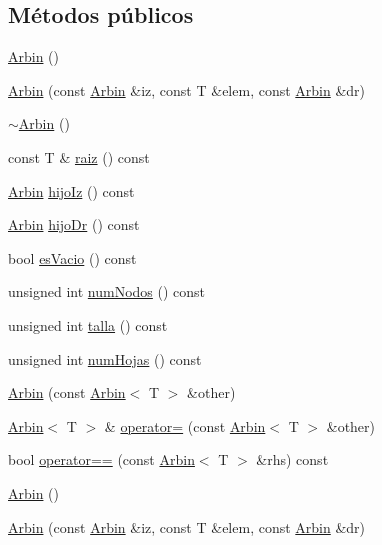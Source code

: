 \subsection*{\-Métodos públicos}
\begin{DoxyCompactItemize}
\item 
\hyperlink{class_arbin_aa0afe84fc8240dbd4539746ade54adac}{\-Arbin} ()
\item 
\hyperlink{class_arbin_abbd49f9c60575ea6a95dfff15492f8f9}{\-Arbin} (const \hyperlink{class_arbin}{\-Arbin} \&iz, const \-T \&elem, const \hyperlink{class_arbin}{\-Arbin} \&dr)
\item 
\hyperlink{class_arbin_a9045fbb22bb9e6a59deab2bf6f69e879}{$\sim$\-Arbin} ()
\item 
const \-T \& \hyperlink{class_arbin_a954e86d83269c6166bb21fd032914622}{raiz} () const 
\item 
\hyperlink{class_arbin}{\-Arbin} \hyperlink{class_arbin_a1ab4f143c3db9e6cb6c7c0c1bba18a6b}{hijo\-Iz} () const 
\item 
\hyperlink{class_arbin}{\-Arbin} \hyperlink{class_arbin_a0ca95be8314f9837667b86bd646aec8c}{hijo\-Dr} () const 
\item 
bool \hyperlink{class_arbin_ac82861483558c565d174a3afffd4778c}{es\-Vacio} () const 
\item 
unsigned int \hyperlink{class_arbin_a7167b5d88652581c404e3c3fc49177cb}{num\-Nodos} () const 
\item 
unsigned int \hyperlink{class_arbin_a875a7e020e2cf5c42dfeed73519c7ce4}{talla} () const 
\item 
unsigned int \hyperlink{class_arbin_aed6e1397e19b444f37f104cd76e235f9}{num\-Hojas} () const 
\item 
\hyperlink{class_arbin_a6a33e5b960e6b67eb906e86839d213ed}{\-Arbin} (const \hyperlink{class_arbin}{\-Arbin}$<$ \-T $>$ \&other)
\item 
\hyperlink{class_arbin}{\-Arbin}$<$ \-T $>$ \& \hyperlink{class_arbin_a20d48b162271c62a79adec950e779e0e}{operator=} (const \hyperlink{class_arbin}{\-Arbin}$<$ \-T $>$ \&other)
\item 
bool \hyperlink{class_arbin_af848201d495953438d4408ba7cc1c29d}{operator==} (const \hyperlink{class_arbin}{\-Arbin}$<$ \-T $>$ \&rhs) const 
\item 
\hyperlink{class_arbin_aa0afe84fc8240dbd4539746ade54adac}{\-Arbin} ()
\item 
\hyperlink{class_arbin_abbd49f9c60575ea6a95dfff15492f8f9}{\-Arbin} (const \hyperlink{class_arbin}{\-Arbin} \&iz, const \-T \&elem, const \hyperlink{class_arbin}{\-Arbin} \&dr)

\end{DoxyCompactItemize}
